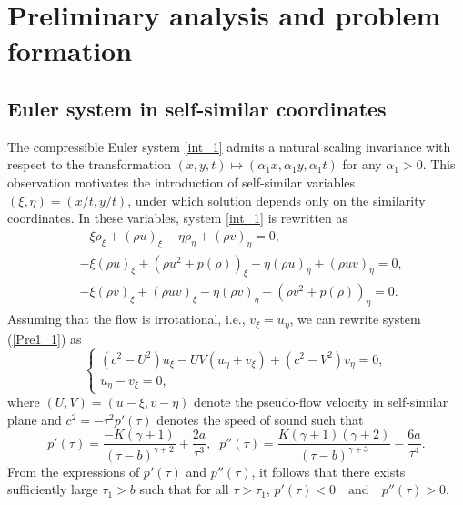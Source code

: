 \documentclass[3p,11pt]{elsarticle}
\numberwithin{equation}{section}
\begin{document}


\section{Preliminary analysis and problem formation}


\subsection{Euler system in self-similar coordinates}

The compressible Euler system \eqref{int_1} admits a natural scaling invariance with respect to the transformation $(x,y,t)\mapsto(\alpha_1 x,\alpha_1 y,\alpha_1 t)$ for any $\alpha_1>0$. This observation motivates the introduction of self-similar variables $(\xi,\eta)=(x/t,y/t)$, under which solution depends only on the similarity coordinates. In these variables, system \eqref{int_1} is rewritten as
\begin{equation}\label{Pre1_1}
\begin{split}
   &-\xi\rho_\xi+(\rho u)_\xi-\eta\rho_\eta+(\rho v)_\eta=0,\\
   &-\xi(\rho u)_\xi+(\rho u^2+p(\rho))_\xi-\eta(\rho u)_\eta +(\rho u v)_\eta=0,\\
   &-\xi(\rho v)_\xi+(\rho uv)_\xi-\eta(\rho v)_\eta+(\rho v^2+p(\rho))_\eta=0.
\end{split}
\end{equation}
Assuming that the flow is irrotational, i.e., $v_\xi=u_\eta$, we can rewrite system (\ref{Pre1_1}) as
\begin{equation}\label{Pre1_2}
    \begin{cases}
        (c^2-U^2)u_\xi-UV(u_\eta+v_\xi)+(c^2-V^2)v_\eta=0,\\
        u_\eta-v_\xi=0,
    \end{cases}
\end{equation}
where $(U,V)=(u-\xi,v-\eta)$ denote the pseudo-flow velocity in self-similar plane and $c^2=-\tau^2p'(\tau)$ denotes the speed of sound such that
\begin{equation}\label{int_3}
    p'(\tau)=\frac{-K(\gamma+1)}{(\tau-b)^{\gamma+2}}+\frac{2a}{\tau^3}, \;\;p''(\tau)=\frac{K(\gamma+1)(\gamma+2)}{(\tau-b)^{\gamma+3}}-\frac{6a}{\tau^4}.
\end{equation}
From the expressions of $p'(\tau)$ and $p''(\tau)$, it follows that there exists sufficiently large $\tau_1>b$ such that for all $\tau>\tau_1$,
$p'(\tau)<0 \quad \text{and} \quad p''(\tau)>0$.
\end{document}
